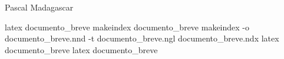 
\usepackage{index}

Pascal
Madagascar

\printindex %
\printindex[luoghi] %


latex documento_breve
makeindex documento_breve
makeindex -o documento_breve.nnd -t documento_breve.ngl documento_breve.ndx
latex documento_breve
latex documento_breve
